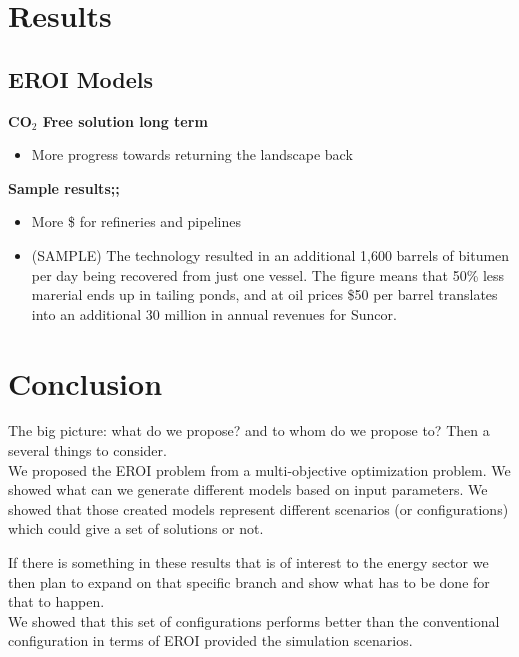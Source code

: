 \documentclass[12pt]{article}
\begin{document}
\section{Results}
\subsection{EROI Models}

{\bf CO$_2$ Free solution long term}
\begin{itemize}
\item More progress towards returning the landscape back
\end{itemize}


{\bf Sample results;;}
\begin{itemize}
\item More \$ for refineries and pipelines
\item (SAMPLE) The technology resulted in an additional 1,600 barrels of bitumen per day being recovered from just one vessel. The figure means that 50\% less marerial ends up in tailing ponds, and at oil prices \$50 per barrel translates into an additional 30 million in annual revenues for Suncor. 
\end{itemize}

\section{Conclusion}
The big picture: what do we propose? and to whom do we propose to? Then a several things to consider. \\

We proposed the EROI problem from a multi-objective optimization problem. We showed what can we generate different models based on input parameters. We showed that those created models represent different scenarios (or configurations) which could give a set of solutions or not. 

If there is something in these results that is of interest to the energy sector we then plan to expand on that specific branch and show what has to be done for that to happen.\\  

We showed that this set of configurations performs better than the conventional configuration in terms of EROI provided the simulation scenarios. \\
\end{document}
